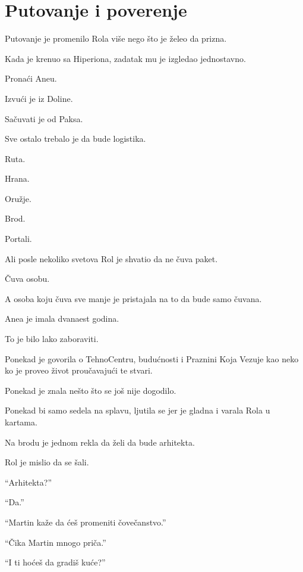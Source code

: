 
\chapter{Putovanje i poverenje}


Putovanje je promenilo Rola više nego što je želeo da prizna.

Kada je krenuo sa Hiperiona, zadatak mu je izgledao jednostavno.

Pronaći Aneu.

Izvući je iz Doline.

Sačuvati je od Paksa.

\bigskip

Sve ostalo trebalo je da bude logistika.

Ruta.

Hrana.

Oružje.

Brod.

Portali.

\bigskip

Ali posle nekoliko svetova Rol je shvatio da ne čuva paket.

Čuva osobu.

A osoba koju čuva sve manje je pristajala na to da bude samo čuvana.

\bigskip

Anea je imala dvanaest godina.

To je bilo lako zaboraviti.

Ponekad je govorila o TehnoCentru, budućnosti i Praznini Koja Vezuje kao neko ko je proveo život proučavajući te stvari.

Ponekad je znala nešto što se još nije dogodilo.

Ponekad bi samo sedela na splavu, ljutila se jer je gladna i varala Rola u kartama.

\bigskip

Na brodu je jednom rekla da želi da bude arhitekta.

Rol je mislio da se šali.

``Arhitekta?''

``Da.''

``Martin kaže da ćeš promeniti čovečanstvo.''

``Čika Martin mnogo priča.''

``I ti hoćeš da gradiš kuće?''

